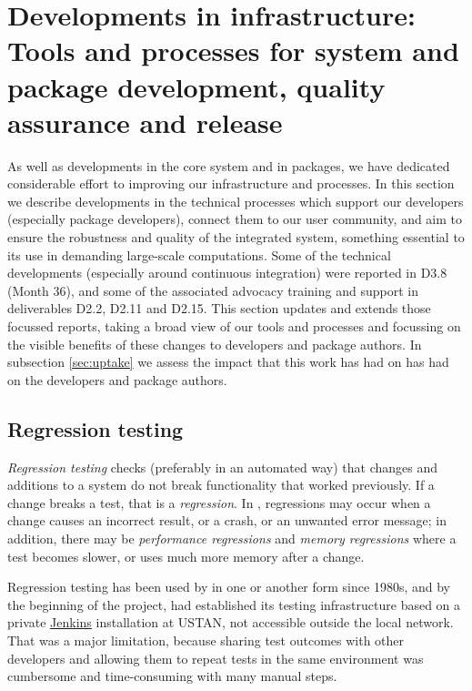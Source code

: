 \section{Developments in \GAP infrastructure: Tools and processes for
  system and package development, quality assurance and release }\label{sec:gap-infra}

As well as developments in the core system and in packages, we have
dedicated considerable effort to improving our infrastructure and
processes.  In this section we describe developments in the technical
processes which support our developers (especially package
developers), connect them to our user community, and aim to ensure the
robustness and quality of the integrated system, something essential
to its use in demanding large-scale computations. Some of the
technical developments (especially around continuous integration) were
reported in D3.8 (Month 36), and some of the associated advocacy
training and support in deliverables D2.2, D2.11 and D2.15. This
section updates and extends those focussed reports, taking a broad
view of our tools and processes and focussing on the visible benefits
of these changes to developers and package authors. In subsection
\ref{sec:uptake} we assess the impact that this work has had on has
had on the developers and package authors.

\subsection{Regression testing}\label{testing}

\emph{Regression testing} %
checks (preferably in an automated way)
that changes and additions to a system do not break functionality that 
worked previously. If a change breaks a test, that is 
a \emph{regression}. In \GAP, regressions may occur
when a change causes an incorrect result, or a crash, or an unwanted error
message; in addition, there may be \emph{performance regressions}
and \emph{memory regressions} where a test becomes slower, or uses
much more memory after a change.

Regression testing has been used by \GAP in one or another form since 
1980s, and by the beginning of the \ODK project, \GAP had established its testing infrastructure
based on a private \href{https://jenkins.io/}{\sf Jenkins} installation
at USTAN, not accessible outside the local network. That was a major limitation,
because sharing test outcomes with other developers and
allowing them to repeat tests in the same environment was cumbersome
and time-consuming with many manual steps.

